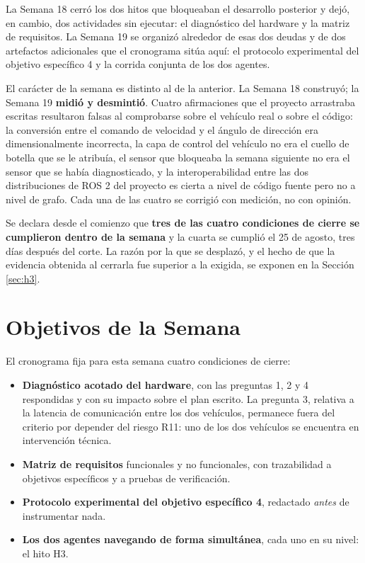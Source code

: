 \documentclass[12pt,letterpaper]{article}
\begin{document}
La Semana 18 cerró los dos hitos que bloqueaban el desarrollo posterior y dejó, en cambio, dos actividades sin ejecutar: el diagnóstico del hardware y la matriz de requisitos. La Semana 19 se organizó alrededor de esas dos deudas y de dos artefactos adicionales que el cronograma sitúa aquí: el protocolo experimental del objetivo específico 4 y la corrida conjunta de los dos agentes.

El carácter de la semana es distinto al de la anterior. La Semana 18 construyó; la Semana 19 \textbf{midió y desmintió}. Cuatro afirmaciones que el proyecto arrastraba escritas resultaron falsas al comprobarse sobre el vehículo real o sobre el código: la conversión entre el comando de velocidad y el ángulo de dirección era dimensionalmente incorrecta, la capa de control del vehículo no era el cuello de botella que se le atribuía, el sensor que bloqueaba la semana siguiente no era el sensor que se había diagnosticado, y la interoperabilidad entre las dos distribuciones de ROS 2 del proyecto es cierta a nivel de código fuente pero no a nivel de grafo. Cada una de las cuatro se corrigió con medición, no con opinión.

Se declara desde el comienzo que \textbf{tres de las cuatro condiciones de cierre se cumplieron dentro de la semana} y la cuarta se cumplió el 25 de agosto, tres días después del corte. La razón por la que se desplazó, y el hecho de que la evidencia obtenida al cerrarla fue superior a la exigida, se exponen en la Sección \ref{sec:h3}.

\section{Objetivos de la Semana}

El cronograma fija para esta semana cuatro condiciones de cierre:

\begin{itemize}
    \item \textbf{Diagnóstico acotado del hardware}, con las preguntas 1, 2 y 4 respondidas y con su impacto sobre el plan escrito. La pregunta 3, relativa a la latencia de comunicación entre los dos vehículos, permanece fuera del criterio por depender del riesgo R11: uno de los dos vehículos se encuentra en intervención técnica.
    \item \textbf{Matriz de requisitos} funcionales y no funcionales, con trazabilidad a objetivos específicos y a pruebas de verificación.
    \item \textbf{Protocolo experimental del objetivo específico 4}, redactado \emph{antes} de instrumentar nada.
    \item \textbf{Los dos agentes navegando de forma simultánea}, cada uno en su nivel: el hito H3.
\end{itemize}
\end{document}
